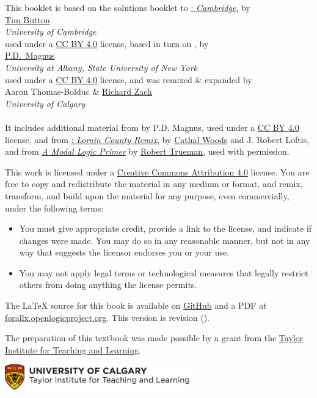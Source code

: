 \noindent This booklet is based on the solutions booklet to \href{https://www.homepages.ucl.ac.uk/~uctytbu/OERs.html}{\forallx: \emph{Cambridge}}, by\\[2ex]
\href{https://www.homepages.ucl.ac.uk/~uctytbu/}{Tim Button}\\
\emph{University of Cambridge}\\[2ex]
used under a \href{https://creativecommons.org/licenses/by/4.0/}{CC BY 4.0} license, based in turn on \href{https://www.fecundity.com/logic/}{\forallx}, by\\[2ex]
\href{https://www.fecundity.com/job/}{P.D.\ Magnus}\\
\emph{University at Albany, State University of New York}\\[2ex]
used under a \href{https://creativecommons.org/licenses/by/4.0/}{CC BY
4.0} license, and was remixed \& expanded by\\[2ex] {Aaron
Thomas-Bolduc \& \href{https://richardzach.org/}{Richard Zach}}\\
\emph{University of Calgary}
\\
\\
It includes additional material from \forallx{} by P.D. Magnus, used
under a \href{https://creativecommons.org/licenses/by/4.0/}{CC BY 4.0}
license, and
from \href{https://github.com/rob-helpy-chalk/openintroduction}{\forallx: \emph{Lorain
County Remix}},
by \href{https://sites.google.com/site/cathalwoods/}{Cathal Woods} and
J. Robert Loftis, and from
\href{http://www.rtrueman.com/uploads/7/0/3/2/70324387/modal_logic_primer.pdf}{\emph{A Modal Logic Primer}} by \href{http://www.rtrueman.com/}{Robert
Trueman}, used with permission.

\bigskip

\noindent This work is licensed under a \href{https://creativecommons.org/licenses/by/4.0/}{Creative Commons Attribution 4.0} license. 
You are free to copy and redistribute the material in any medium or format, and  remix, transform, and build upon the material for any purpose, even commercially, under the following terms:
\begin{itemize}
\item You must give appropriate credit, provide a link to the license, and indicate if changes were made. You may do so in any reasonable manner, but not in any way that suggests the licensor endorses you or your use.
\item You may not apply legal terms or technological measures that legally restrict others from doing anything the license permits.
\end{itemize}
The \LaTeX{} source for this book is available on
\href{https://github.com/rzach/forallx-yyc/}{GitHub} and a PDF at
\href{https://forallx.openlogicproject.org}{forallx.openlogicproject.org}.
This version is revision \gitAbbrevHash{} (\gitAuthorDate).

\bigskip
\noindent The preparation of this textbook was made possible by a grant from the \href{https://taylorinstitute.ucalgary.ca/}{Taylor Institute for Teaching and Learning}.

\bigskip
\noindent
\href{https://taylorinstitute.ucalgary.ca/}{\includegraphics[width=8cm]{../assets/ti-color}}
